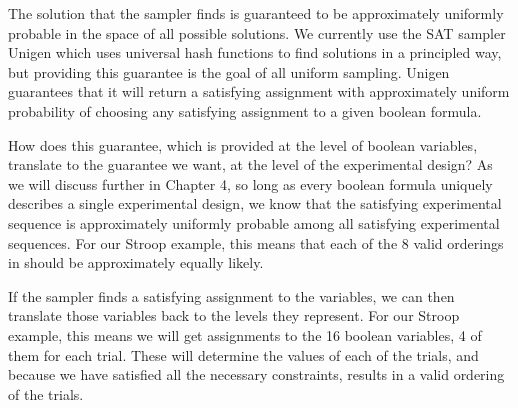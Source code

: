 The solution that the sampler finds is guaranteed to be approximately uniformly probable in the space of all possible solutions. We currently use the SAT sampler Unigen which uses universal hash functions to find solutions in a principled way, but providing this guarantee is the goal of all uniform sampling. Unigen guarantees that it will return a satisfying assignment with approximately uniform probability of choosing any satisfying assignment to a given boolean formula.

How does this guarantee, which is provided at the level of boolean variables, translate to the guarantee we want, at the level of the experimental design? As we will discuss further in Chapter 4, so long as every boolean formula uniquely describes a single experimental design, we know that the satisfying experimental sequence is approximately uniformly probable among all satisfying experimental sequences. For our Stroop example, this means that each of the 8 valid orderings in  should be approximately equally likely.

If the sampler finds a satisfying assignment to the variables, we can then translate those variables back to the levels they represent. For our Stroop example, this means we will get assignments to the 16 boolean variables, 4 of them for each trial. These will determine the values of each of the trials, and because we have satisfied all the necessary constraints, results in a valid ordering of the trials.
